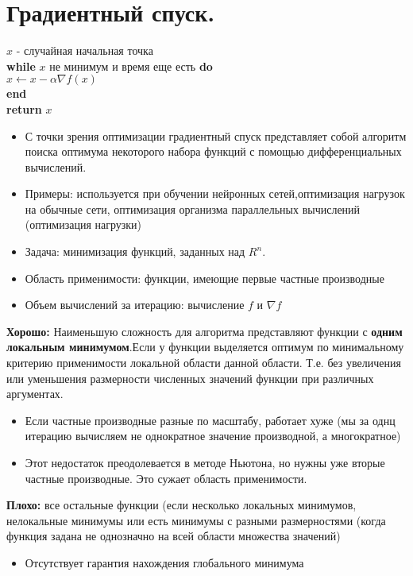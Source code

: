 \section{Градиентный спуск.}

  $x$ - случайная начальная точка\\ 
  \textbf{while} $x$ не минимум и время еще есть \textbf{do} \\
  $x \gets x-\alpha\nabla f(x)$\\
  \textbf{end}\\
  \textbf{return} $ x $\\

    \begin{itemize}
      \item С точки зрения оптимизации градиентный спуск представляет собой алгоритм поиска оптимума некоторого набора функций с помощью дифференциальных вычислений.
      \item Примеры: используется при обучении нейронных сетей,оптимизация нагрузок на обычные сети, оптимизация организма параллельных вычислений (оптимизация нагрузки)
      \item  Задача: минимизация функций, заданных над $R^n$. 
      \item Область применимости: функции, имеющие первые частные производные
      \item Объем вычислений за итерацию: вычисление $f$ и $\nabla f$
  \end{itemize}
   \textbf{Хорошо:} Наименьшую сложность для алгоритма представляют функции с  \textbf{одним локальным минимумом}.Если у функции выделяется оптимум по минимальному критерию применимости локальной области данной области. Т.е. без увеличения или уменьшения размерности численных значений функции при различных аргументах.
    \begin{itemize}
    \item Если частные производные разные по масштабу, работает хуже (мы за однц итерацию вычисляем не однократное значение производной, а многократное)
    \item Этот недостаток преодолевается в методе Ньютона, но нужны уже вторые частные производные. Это сужает область применимости.
    \end{itemize}
    \textbf{Плохо:} все остальные функции (если несколько локальных минимумов, нелокальные минимумы или есть минимумы с разными размерностями (когда функция задана не однозначно на всей области множества значений)
    \begin{itemize}
    \item Отсутствует гарантия нахождения глобального минимума
    \end{itemize}
    

